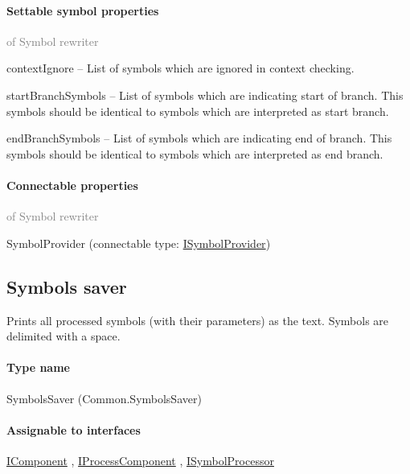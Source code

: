 	\paragraph{Settable symbol properties}\textcolor{gray}{of Symbol rewriter}
	\begin{description*}
		\item[contextIgnore]
			-- List of symbols which are ignored in context checking.
		\item[startBranchSymbols]
			-- List of symbols which are indicating start of branch.
            This symbols should be identical to symbols which are interpreted as start branch.
		\item[endBranchSymbols]
			-- List of symbols which are indicating end of branch.
            This symbols should be identical to symbols which are interpreted as end branch.
	\end{description*}
	\paragraph{Connectable properties}\textcolor{gray}{of Symbol rewriter}
	\begin{description*}
		\item[SymbolProvider]
		(connectable type:  \hyperref[Malsys.Processing.Components.ISymbolProvider]{ISymbolProvider})
	\end{description*}
	


\subsection{Symbols saver}
\label{Malsys.Processing.Components.Common.SymbolsSaver}
Prints all processed symbols (with their parameters) as the text.
            Symbols are delimited with a space.\paragraph{Type name}
SymbolsSaver (Common.SymbolsSaver) 	\paragraph{Assignable to interfaces}
		\hyperref[Malsys.Processing.Components.IComponent]{IComponent}%
, 		\hyperref[Malsys.Processing.Components.IProcessComponent]{IProcessComponent}%
, 		\hyperref[Malsys.Processing.Components.ISymbolProcessor]{ISymbolProcessor}%
	
